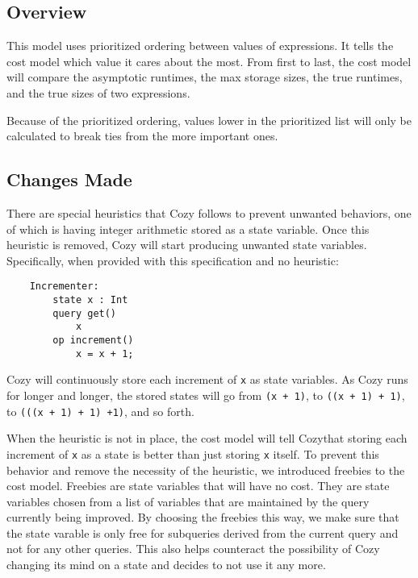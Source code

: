 \newcommand{\code}[1]{\texttt{#1}}

\subsection{Overview}
This model uses prioritized ordering between values of expressions. It tells the
cost model which value it cares about the most. From first to last, the cost
model will compare the asymptotic runtimes, the max storage sizes, the true
runtimes, and the true sizes of two expressions.

Because of the prioritized ordering, values lower in the prioritized list will
only be calculated to break ties from the more important ones.

\subsection{Changes Made}
There are special heuristics that Cozy follows to prevent unwanted behaviors,
one of which is having integer arithmetic stored as a state variable. Once this
heuristic is removed, Cozy will start producing unwanted state variables.
Specifically, when provided with this specification and no heuristic:

\begin{center}
\begin{lstlisting}
    Incrementer:
        state x : Int
        query get()
            x
        op increment()
            x = x + 1;
\end{lstlisting}
\end{center}

Cozy will continuously store each increment of \code{x} as state variables. As
Cozy runs for longer and longer, the stored states will go from \code{(x + 1)},
to \code{((x + 1) + 1)}, to \code{(((x + 1) + 1) +1)}, and so forth.

When the heuristic is not in place, the cost model will tell Cozythat storing
each increment of \code{x} as a state is better than just storing \code{x}
itself. To prevent this behavior and remove the necessity of the heuristic, we
introduced freebies to the cost model. Freebies are state variables that will
have no cost. They are state variables chosen from a list of variables that are
maintained by the query currently being improved. By choosing the freebies this
way, we make sure that the state varable is only free for subqueries derived
from the current query and not for any other queries. This also helps counteract
the possibility of Cozy changing its mind on a state and decides to not use it
any more.
